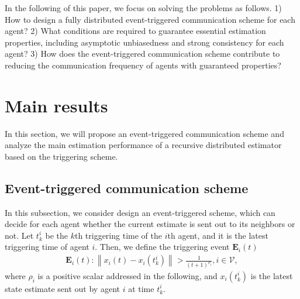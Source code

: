 \documentclass[10pt,journal,final]{IEEEtran}
\newcommand{\norm}[1]{\left\lVert#1\right\rVert}
\theoremstyle{plain}
\theoremstyle{definition}
\theoremstyle{remark}
\begin{document}
In the following of this paper, we focus on solving the problems as follows.
1) How to design a fully distributed event-triggered communication scheme for each agent?
2) What conditions are required to guarantee essential estimation properties, including asymptotic unbiasedness and strong consistency for each agent?
3) How does the event-triggered communication scheme  contribute to reducing the communication frequency of agents with guaranteed properties?





\section{Main results}
In this section, we will propose an event-triggered communication scheme and analyze the main estimation performance of a recursive distributed estimator based on the triggering scheme.
\subsection{Event-triggered communication scheme}

In this subsection, we consider design an event-triggered scheme, which can decide for each agent whether the current estimate is sent out to its neighbors or not.
Let  $t_{k}^i$ be the $k$th triggering time of the $i$th agent, and it is the latest triggering time of agent $i$. 
Then, we define the  triggering event $\mathbf{E}_{i}(t)$ 
\begin{align}\label{eq_event}
\mathbf{E}_{i}(t): \norm{x_{i}(t)-x_{i}(t_{k}^i)}>\frac{1}{ (t+1)^{\rho_i}}, i\in\mathcal{V},
\end{align}
where $\rho_i$ is a positive scalar addressed in the following, and $x_{i}(t_{k}^i)$ is the latest state estimate sent out by agent $i$ at time $t_{k}^i$.
\end{document}
